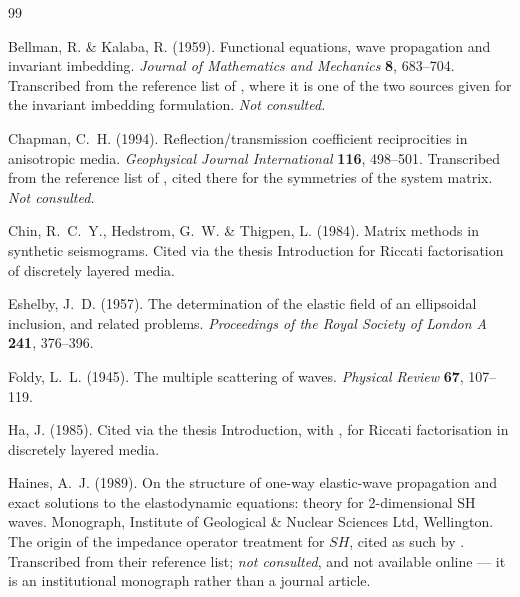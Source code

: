 \documentclass[11pt,a4paper]{article}
\begin{document}
\begingroup
\renewcommand{\section}[2]{}
\begin{thebibliography}{99}\small

 Bellman, R. \& Kalaba, R. (1959).
  Functional equations, wave propagation and invariant imbedding.
  \emph{Journal of Mathematics and Mechanics} \textbf{8}, 683--704.
  Transcribed from the reference list of \cite{haines2004}, where it is one of
  the two sources given for the invariant imbedding formulation.  \emph{Not
  consulted.}

 Chapman, C.~H. (1994).
  Reflection/transmission coefficient reciprocities in anisotropic media.
  \emph{Geophysical Journal International} \textbf{116}, 498--501.
  Transcribed from the reference list of \cite{haines2004}, cited there for the
  symmetries of the system matrix.  \emph{Not consulted.}

 Chin, R.~C.~Y., Hedstrom, G.~W. \& Thigpen, L. (1984).
  Matrix methods in synthetic seismograms.  Cited via the thesis
  Introduction for Riccati factorisation of discretely layered media.

 Eshelby, J.~D. (1957).  The determination of the elastic
  field of an ellipsoidal inclusion, and related problems.  \emph{Proceedings
  of the Royal Society of London A} \textbf{241}, 376--396.

 Foldy, L.~L. (1945).  The multiple scattering of waves.
  \emph{Physical Review} \textbf{67}, 107--119.

 Ha, J. (1985).  Cited via the thesis Introduction, with
  \cite{chin1984}, for Riccati factorisation in discretely layered media.

 Haines, A.~J. (1989).  On the structure
  of one-way elastic-wave propagation and exact solutions to the elastodynamic
  equations: theory for 2-dimensional SH waves.  Monograph, Institute of
  Geological \& Nuclear Sciences Ltd, Wellington.  The origin of the impedance
  operator treatment for $SH$, cited as such by \cite{haines2004}.
  Transcribed from their reference list; \emph{not consulted}, and not
  available online --- it is an institutional monograph rather than a journal
  article.


\end{thebibliography}
\end{document}

